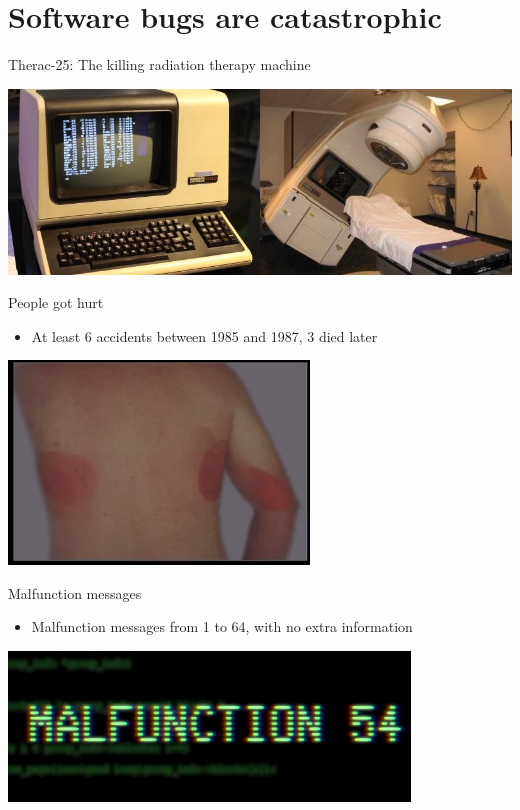\documentclass[presentation]{beamer}
\begin{document}
\section{Software bugs are catastrophic}
\label{sec:orgb8c2f33}
\begin{frame}[label={sec:org90f989a}]{Therac-25: The killing radiation therapy machine}
\begin{center}
\includegraphics[width=.9\linewidth]{./therac25.png}
\end{center}
\end{frame}
\begin{frame}[label={sec:org2d9b594}]{People got hurt}
\begin{itemize}
\item At least 6 accidents between 1985 and 1987, 3 died later
\end{itemize}

\begin{center}
\includegraphics[width=0.6\textwidth]{./radiation.png}
\end{center}
\end{frame}
\begin{frame}[label={sec:org992ff53}]{Malfunction messages}
\begin{itemize}
\item Malfunction messages from 1 to 64, with no extra information
\end{itemize}

\begin{center}
\includegraphics[width=0.8\textwidth]{./error54.png}
\end{center}
\end{frame}
\end{document}

